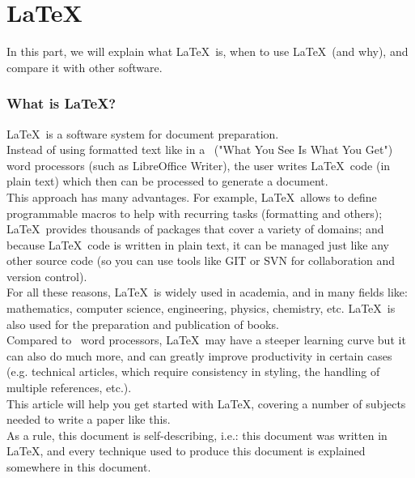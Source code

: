 
\part{\LaTeX}

In this part, we will explain what \LaTeX\ is, when to use \LaTeX\ (and why), and compare it with other software.

\section{What is \LaTeX?}

\LaTeX\ is a software system for document preparation. \\
Instead of using formatted text like in a \WYSIWYG\ ("What You See Is What You Get") word processors (such as LibreOffice Writer), the user writes \LaTeX\ code (in plain text) which then can be processed to generate a document. \\

This approach has many advantages. For example, \LaTeX\ allows to define programmable macros to help with recurring tasks (formatting and others); \LaTeX\ provides thousands of packages that cover a variety of domains; and because \LaTeX\ code is written in plain text, it can be managed just like any other source code (so you can use tools like GIT or SVN for collaboration and version control). \\

For all these reasons, \LaTeX\ is widely used in academia, and in many fields like: mathematics, computer science, engineering, physics, chemistry, etc. \LaTeX\ is also used for the preparation and publication of books. \\

Compared to \WYSIWYG\ word processors, \LaTeX\ may have a steeper learning curve but it can also do much more, and can greatly improve productivity in certain cases (e.g. technical articles, which require consistency in styling, the handling of multiple references, etc.). \\
This article will help you get started with \LaTeX, covering a number of subjects needed to write a paper like this. \\

As a rule, this document is self-describing, i.e.: this document was written in \LaTeX, and every technique used to produce this document is explained somewhere in this document.


